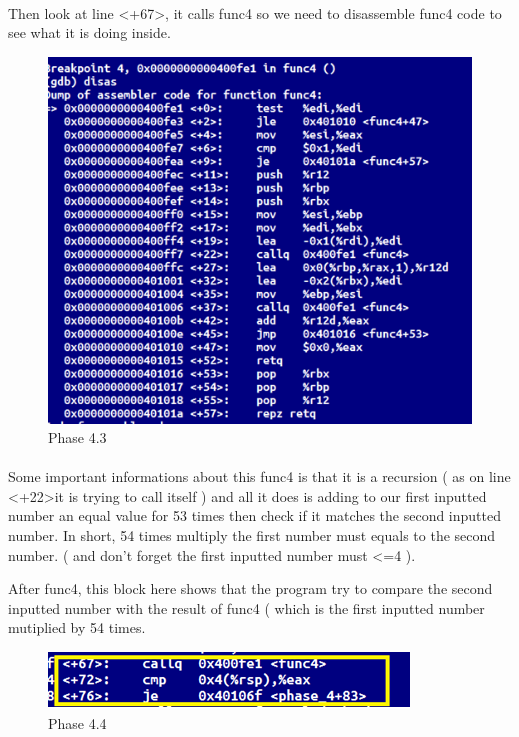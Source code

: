 \documentclass[a4paper]{article}
\begin{document}
\paragraph{}
Then look at line \textless +67\textgreater, it calls func4 so we need to disassemble func4 code to see what it is doing inside.

\begin{figure}[h!]
  \includegraphics[width=\linewidth]{bai4_3.png}
  \caption{Phase 4.3}
  \label{}
\end{figure}

\paragraph{}
Some important informations about this func4 is that it is a recursion ( as on line \textless +22\textgreater  it is trying to call itself ) and all it does is adding to our first inputted number an equal value for 53 times then check if it matches the second inputted number. In short, 54 times multiply the first number must equals to the second number.  ( and don't forget the first inputted number must \textless=4 ).  

After func4, this block here shows that the program try to compare the second inputted number with the result of func4 ( which is the first inputted number mutiplied  by 54 times. 

\begin{figure}[h!]
  \includegraphics[width=\linewidth]{bai4_4.png}
  \caption{Phase 4.4}
  \label{}
\end{figure}
\end{document}
